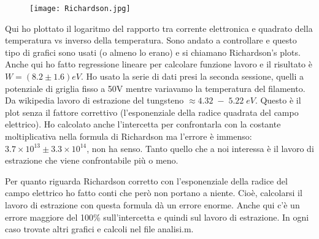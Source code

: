 \documentclass{article}
\begin{document}
\begin{figure}[htbp]
		\centering
			\texttt{[image: Richardson.jpg]}
\end{figure}

Qui ho plottato il logaritmo del rapporto tra corrente elettronica e quadrato della temperatura vs inverso della temperatura. Sono andato a controllare e questo tipo di grafici sono usati (o almeno lo erano) e si chiamano Richardson's plots. Anche qui ho fatto regressione lineare per calcolare funzione lavoro e il risultato è $W = (8.2 \pm 1.6) eV$. Ho usato la serie di dati presi la seconda sessione, quelli a potenziale di griglia fisso a 50V mentre variavamo la temperatura del filamento. Da wikipedia lavoro di estrazione del tungsteno $\approx 4.32 \; - \; 5.22 \; eV$. Questo è il plot senza il fattore correttivo (l'esponenziale della radice quadrata del campo elettrico). Ho calcolato anche l'intercetta per confrontarla con la costante moltiplicativa nella formula di Richardson ma l'errore è immenso: $3.7 \times 10^{13} \pm 3.3 \times 10^{14}$, non ha senso. Tanto quello che a noi interessa è il lavoro di estrazione che viene confrontabile più o meno.

Per quanto riguarda Richardson corretto con l'esponenziale della radice del campo elettrico ho fatto conti che però non portano a niente. Cioè, calcolarsi il lavoro di estrazione con questa formula dà un errore enorme. Anche qui c'è un errore maggiore del 100\% sull'intercetta e quindi sul lavoro di estrazione. In ogni caso trovate altri grafici e calcoli nel file analisi.m. 
\end{document}
